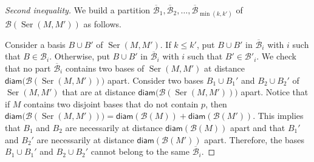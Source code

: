\documentclass[10pt,a4paper]{amsart}
\def \B {\mathcal{B}}
\newcommand{\Ser}{\operatorname{Ser}}
\newcommand{\diame}{\mathsf{diam}}
\renewcommand{\leq}{\leqslant}
\begin{document}
\begin{proof}
[Second inequality] We build a partition $\overline{\B}_1,\overline{\B}_2,\ldots,\overline{\B}_{\min(k,k')}$ of $\B(\Ser(M,M'))$ as follows.

Consider a basis $B \cup B'$ of $\Ser(M,M')$. If $k \leq k'$, put $B \cup B'$ in $\overline{\B}_i$ with $i$ such that $B \in \B_i$. Otherwise, put $B \cup B'$ in $\overline{\B}_i$ with $i$ such that $B' \in \B'_i$. We check that no part $\overline{\B}_i$ contains two bases of $\Ser(M,M')$ at distance $\diame\bigl(\B(\Ser(M,M'))\bigr)$ apart. Consider two bases $B_1 \cup B_1'$ and $B_2\cup B_2'$ of $\Ser(M,M')$ that are at distance $\diame\bigl(\B(\Ser(M,M'))\bigr)$ apart. Notice that if $M$ contains two disjoint bases that do not contain $p$, then $\diame\bigl(\B(\Ser(M,M'))\bigr) = \diame(\B(M)) + \diame(\B(M'))$. This implies that $B_1$ and $B_2$ are necessarily at distance $\diame(\B(M))$ apart and that $B_1'$ and $B_2'$ are necessarily at distance $\diame(\B(M'))$ apart. Therefore, the bases $B_1 \cup B_1'$ and $B_2 \cup B_2'$ cannot belong to the same $\overline{\B}_i$.
\end{proof}
\end{document}
